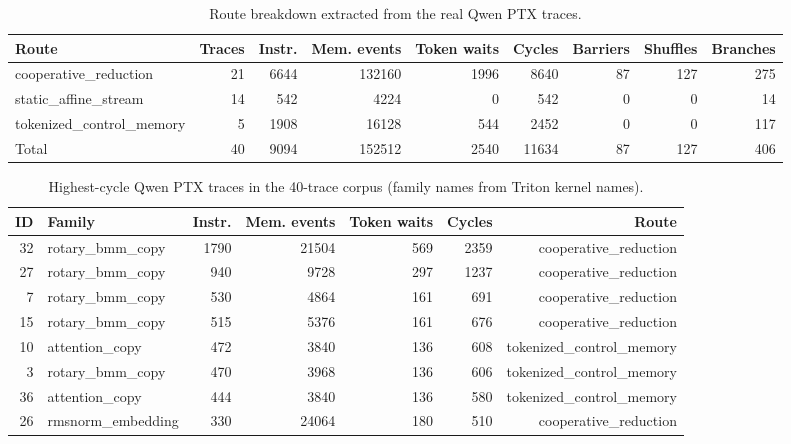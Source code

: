 \documentclass[sigplan,nonacm]{acmart}
\begin{document}
\begin{table}[t]
\centering
\caption{Route breakdown extracted from the real Qwen PTX traces.}
\label{tab:qwen-trace-route}
\small
\begin{tabular}{lrrrrrrrr}
\toprule
Route & Traces & Instr. & Mem. events & Token waits & Cycles & Barriers & Shuffles & Branches \\
\midrule
cooperative\_reduction & 21 & 6644 & 132160 & 1996 & 8640 & 87 & 127 & 275 \\
static\_affine\_stream & 14 & 542 & 4224 & 0 & 542 & 0 & 0 & 14 \\
tokenized\_control\_memory & 5 & 1908 & 16128 & 544 & 2452 & 0 & 0 & 117 \\
\midrule
Total & 40 & 9094 & 152512 & 2540 & 11634 & 87 & 127 & 406 \\
\bottomrule
\end{tabular}
\end{table}

\begin{table}[t]
\centering
\caption{Highest-cycle Qwen PTX traces in the 40-trace corpus (family names from Triton kernel names).}
\label{tab:qwen-trace-top}
\small
\begin{tabular}{rlrrrrr}
\toprule
ID & Family & Instr. & Mem. events & Token waits & Cycles & Route \\
\midrule
32 & rotary\_bmm\_copy & 1790 & 21504 & 569 & 2359 & cooperative\_reduction \\
27 & rotary\_bmm\_copy & 940 & 9728 & 297 & 1237 & cooperative\_reduction \\
7 & rotary\_bmm\_copy & 530 & 4864 & 161 & 691 & cooperative\_reduction \\
15 & rotary\_bmm\_copy & 515 & 5376 & 161 & 676 & cooperative\_reduction \\
10 & attention\_copy & 472 & 3840 & 136 & 608 & tokenized\_control\_memory \\
3 & rotary\_bmm\_copy & 470 & 3968 & 136 & 606 & tokenized\_control\_memory \\
36 & attention\_copy & 444 & 3840 & 136 & 580 & tokenized\_control\_memory \\
26 & rmsnorm\_embedding & 330 & 24064 & 180 & 510 & cooperative\_reduction \\
\bottomrule
\end{tabular}
\end{table}
\end{document}
